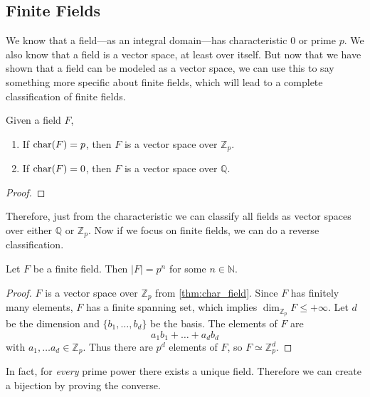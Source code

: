 \subsection{Finite Fields} 

  We know that a field---as an integral domain---has characteristic $0$ or prime $p$. We also know that a field is a vector space, at least over itself. But now that we have shown that a field can be modeled as a vector space, we can use this to say something more specific about finite fields, which will lead to a complete classification of finite fields. 

  \begin{theorem}
    \label{thm:char_field}
    Given a field $F$, 
    \begin{enumerate}
      \item If $\Char(F) = p$, then $F$ is a vector space over $\mathbb{Z}_p$. 
      \item If $\Char(F) = 0$, then $F$ is a vector space over $\mathbb{Q}$. 
    \end{enumerate}
  \end{theorem}
  \begin{proof}
    
  \end{proof} 

  Therefore, just from the characteristic we can classify all fields as vector spaces over either $\mathbb{Q}$ or $\mathbb{Z}_p$. Now if we focus on finite fields, we can do a reverse classification. 

  \begin{theorem}
    Let $F$ be a finite field. Then $|F| = p^n$ for some $n \in \mathbb{N}$. 
  \end{theorem}
  \begin{proof}
    $F$ is a vector space over $\mathbb{Z}_p$ from \ref{thm:char_field}. Since $F$ has finitely many elements, $F$ has a finite spanning set, which implies $\dim_{\mathbb{Z}_p} F \leq + \infty$. Let $d$ be the dimension and $\{b_1, \ldots, b_d\}$ be the basis. The elements of $F$ are 
    \begin{equation}
      a_1 b_1 + \ldots + a_d b_d
    \end{equation}
    with $a_1, \ldots a_d \in \mathbb{Z}_p$. Thus there are $p^d$ elements of $F$, so $F \simeq \mathbb{Z}_p^d$. 
  \end{proof}

  In fact, for \textit{every} prime power there exists a unique field. Therefore we can create a bijection by proving the converse. 

